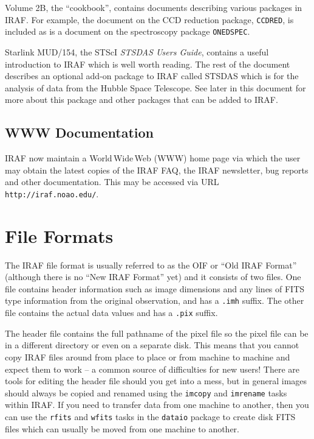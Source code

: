 Volume 2B, the ``cookbook'', contains documents
describing various packages in IRAF. For example, the document on the
CCD reduction package, {\tt CCDRED}, is included as is a document on
the spectroscopy package {\tt ONEDSPEC}. 

Starlink MUD/154, the STScI {\it STSDAS Users Guide}\/, contains a useful
introduction to IRAF which is well worth reading. The rest of the
document describes an optional add-on package to IRAF called STSDAS
which is for the analysis of data from the Hubble Space Telescope. See
later in this document for more about this package and other packages
that can be added to IRAF.

\subsection*{WWW Documentation}
 
IRAF now maintain a World\,Wide\,Web (WWW) home page via which
the user may obtain the latest copies of the IRAF FAQ, the IRAF newsletter,
bug reports and other documentation. This may be accessed via URL
{\tt http://iraf.noao.edu/}.

\section{File Formats}

The IRAF file format is usually referred to as the OIF or ``Old IRAF
Format'' (although there is no ``New IRAF Format'' yet) and it consists of
two files. One file contains header information such as image
dimensions and any lines of FITS type information from the original
observation, and has a {\tt .imh} suffix. The other file contains the
actual data values and has a {\tt .pix} suffix. 

The header file contains the full pathname of the pixel file so the
pixel file can be in a different directory or even on a separate
disk. This means that you cannot copy IRAF files around from place to
place or from machine to machine and expect them to work -- a common
source of difficulties for new users! There are tools for editing the
header file should you get into a mess, but in general images should
always be copied and renamed using the {\tt imcopy} and {\tt imrename}
tasks within IRAF. If you need to transfer data from one machine to
another, then you can use the {\tt rfits} and {\tt wfits} tasks in the
{\tt dataio} package to create disk FITS files which can usually be
moved from one machine to another.

